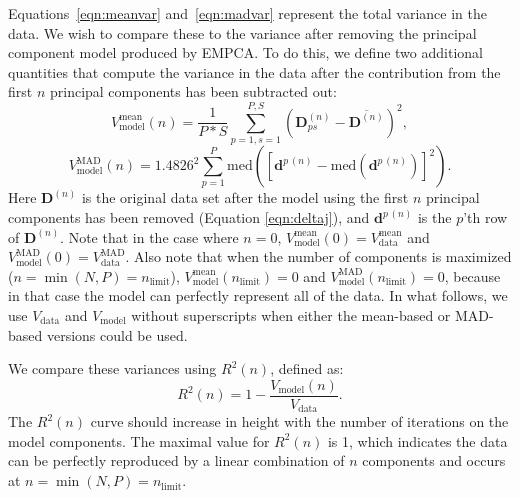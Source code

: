 \documentclass[a4paper,fleqn,usenatbib]{mnras}
\newcommand       \Rsq      {{R^2}}
\begin{document}
Equations~\eqref{eqn:meanvar} and~\eqref{eqn:madvar} represent the total variance in the data. We wish to compare these to the variance after removing the principal component model produced by EMPCA. To do this, we define two additional quantities that compute the variance in the data after the contribution from the first $n$ principal components has been subtracted out:
%
\begin{equation}
V_{\mathrm{model}}^{\mathrm{mean}}(n) = \frac{1}{P*S}\sum_{p=1,s=1}^{P,S}\left(\mathbf{D}^{(n)}_{ps} - \overline{\mathbf{D}^{(n)}}\right)^2,
\label{eqn:meanveig}
\end{equation}
\begin{equation}
V_{\mathrm{model}}^{\mathrm{MAD}}(n) = 1.4826^2\sum_{p=1}^{P}\mathrm{med}\left(\left[\mathbf{d}^{p\,(n)} - \mathrm{med}\left(\mathbf{d}^{p\,(n)}\right)\right]^2\right).
\label{eqn:madveig}
\end{equation}
Here $\mathbf{D}^{(n)}$ is the original data set after the model using the first $n$ principal components has been removed (Equation \eqref{eqn:deltaj}), and $\mathbf{d}^{p\,(n)}$ is the $p$'th row of $\mathbf{D}^{(n)}$. Note that in the case where $n=0$, $V_{\mathrm{model}}^{\mathrm{mean}}(0) = V_{\mathrm{data}}^{\mathrm{mean}}$ and $V_{\mathrm{model}}^{\mathrm{MAD}}(0) = V_{\mathrm{data}}^{\mathrm{MAD}}$. Also note that when the number of components is maximized ($n = \min(N,P) = n_{\mathrm{limit}}$), $V_{\mathrm{model}}^{\mathrm{mean}}(n_{\mathrm{limit}}) = 0$ and $V_{\mathrm{model}}^{\mathrm{MAD}}(n_{\mathrm{limit}}) = 0$, because in that case the model can perfectly represent all of the data. In what follows, we use $V_{\mathrm{data}}$ and $V_{\mathrm{model}}$ without superscripts when either the mean-based or MAD-based versions could be used.

We compare these variances using $R^2(n)$, defined as:
\begin{equation}
\Rsq(n) = 1 - \frac{V_{\mathrm{model}}(n)}{V_{\mathrm{data}}}.
\label{eqn:Rsq}
\end{equation}
The $R^2(n)$ curve should increase in height with the number of iterations on the model components. The maximal value for $R^2(n)$ is 1, which indicates the data can be perfectly reproduced by a linear combination of $n$ components and occurs at $n = \min(N,P) = n_{\mathrm{limit}}$.
\end{document}

